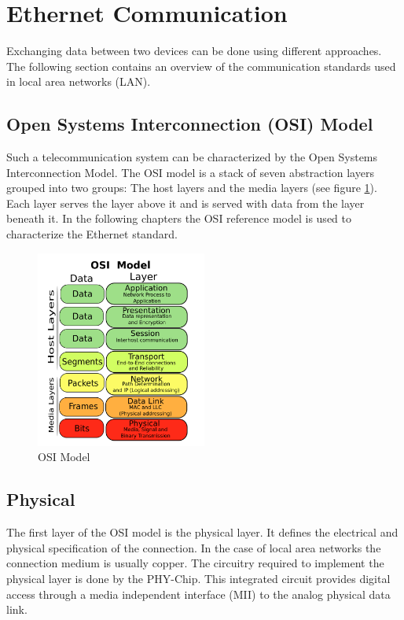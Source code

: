 %
%
\section{Ethernet Communication} \label{chapt:ethernet}
Exchanging data between two devices can be done using different approaches. The
following section contains an overview of the communication standards used in
local area networks (LAN).

\subsection{Open Systems Interconnection (OSI) Model}
Such a telecommunication system can be characterized by the Open Systems 
Interconnection Model. The OSI model is a stack of seven abstraction layers 
grouped into two groups: The host layers and the media layers (see figure \ref{fig:osi}). 
Each layer serves the layer above it and is served with data from the layer
beneath it. In the following chapters the OSI reference model is used to
characterize the Ethernet standard.

\begin{figure}[tb!]
    \centering
    \includegraphics[width=0.5\textwidth]{images/theory/osi.png}
    \caption{OSI Model \cite{osi}}
    \label{fig:osi}
\end{figure}

\subsection{Physical} \label{chapt:physical}
The first layer of the OSI model is the physical layer. It defines the 
electrical and physical specification of the connection. In the case of local
area networks the connection medium is usually copper. The circuitry required to
implement
the physical layer is done by the PHY-Chip. This integrated circuit provides 
digital access through a media independent interface (MII) to the analog physical
data link.

